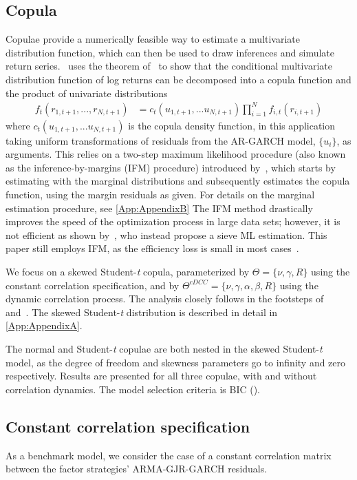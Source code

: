 \subsection{Copula}
Copulae provide a numerically feasible way to estimate a multivariate distribution function, which can then be used to draw inferences and simulate return series.~\textcite{Patton2006} uses the theorem of~\textcite{Sklar1959} to show that the conditional multivariate distribution function of log returns can be decomposed into a copula function and the product of univariate distributions
\begin{align} \label{eq:sklar}
    f_t(r_{1,t+1}, ..., r_{N, t+1}) &= c_t(u_{1, t+1}, ... u_{N, t+1}) \prod^N_{i=1} f_{i,t}(r_{i, t+1})
\end{align}
where $c_t(u_{1, t+1}, ... u_{N, t+1})$ is the copula density function, in this application taking uniform transformations of residuals from the AR-GARCH model, $\{u_i\}$, as arguments. This relies on a two-step maximum likelihood procedure (also known as the inference-by-margins (IFM) procedure) introduced by~\textcite{Joe1997}, which starts by estimating with the marginal distributions and subsequently estimates the copula function, using the margin residuals as given. For details on the marginal estimation procedure, see \autoref{App:AppendixB} The IFM method drastically improves the speed of the optimization process in large data sets; however, it is not efficient as shown by~\textcite{ChenFanTsyrennikov2006}, who instead propose a sieve ML estimation. This paper still employs IFM, as the efficiency loss is small in most cases~\autocite{Patton2006}. 

We focus on a skewed Student-\textit{t} copula, parameterized by $\Theta = \{\nu, \gamma, R\}$ using the constant correlation specification, and by $\Theta^{cDCC} = \{\nu, \gamma, \alpha, \beta, R\}$ using the dynamic correlation process. The analysis closely follows in the footsteps of~\textcite{Aielli2013} and~\textcite{ChristoffersenErrunzaJacobLanglois2012}. The skewed Student-\textit{t} distribution is described in detail in \autoref{App:AppendixA}.

The normal and Student-\textit{t} copulae are both nested in the skewed Student-\textit{t} model, as the degree of freedom and skewness parameters go to infinity and zero respectively. Results are presented for all three copulae, with and without correlation dynamics. The model selection criteria is BIC (\textcite{Schwarz1978}).

\subsection{Constant correlation specification}
As a benchmark model, we consider the case of a constant correlation matrix between the factor strategies' ARMA-GJR-GARCH residuals. 


